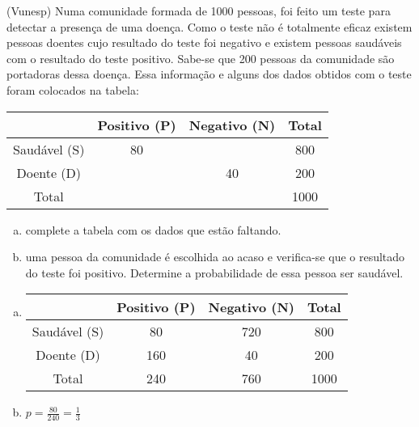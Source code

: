 \begin{ex}
(Vunesp) Numa comunidade formada de 1000 pessoas, foi feito um teste para detectar a presença de uma doença. Como o teste não é totalmente eficaz  existem pessoas doentes cujo resultado do teste foi negativo e existem pessoas saudáveis com o resultado do teste positivo. Sabe-se que 200 pessoas da comunidade são portadoras dessa doença. Essa informação e alguns dos dados obtidos com o teste foram colocados na tabela:\\
\begin{center}
\begin{tabular} {|c|c|c|c|}  \hline
   & Positivo (P) & Negativo (N) & Total \\  \hline
Saudável (S) &   80 &    &    800 \\  \hline
Doente (D)   &      &  40   &  200 \\  \hline
Total  &     &    & 1000 \\ \hline
\end{tabular}
\end{center}
   \begin{enumerate}[(a)]
   \item  complete a tabela com os dados que estão faltando.
   \item  uma pessoa da comunidade é escolhida ao acaso e verifica-se que o resultado do teste foi positivo. Determine a probabilidade de essa pessoa ser saudável.
   \end{enumerate}
    \begin{sol}
     \phantom{A}
       \begin{enumerate} [(a)]
       \item
       \begin{tabular} {|c|c|c|c|}  \hline
   & Positivo (P) & Negativo (N) & Total \\  \hline
Saudável (S) &   80 & 720   &    800 \\  \hline
Doente (D)   &  160    &  40   &  200 \\  \hline
Total  & 240 &  760  & 1000 \\ \hline
\end{tabular}
           \item $p=\frac{80}{240}=\frac{1}{3}$
       \end{enumerate}
    \end{sol}
\end{ex}